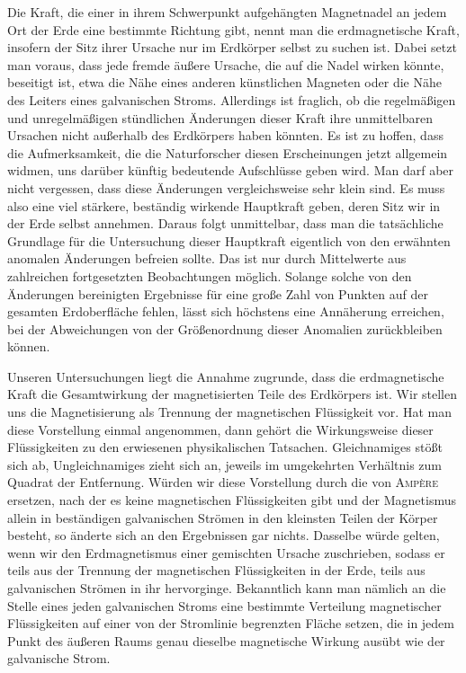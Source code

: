 Die Kraft, die einer in ihrem Schwerpunkt aufgehängten Magnetnadel an jedem Ort der Erde eine bestimmte Richtung gibt, nennt man die erdmagnetische Kraft, insofern der Sitz ihrer Ursache nur im Erdkörper selbst zu suchen ist. Dabei setzt man voraus, dass jede fremde äußere Ursache, die auf die Nadel wirken könnte, beseitigt ist, etwa die Nähe eines anderen künstlichen Magneten oder die Nähe des Leiters eines galvanischen Stroms. Allerdings ist fraglich, ob die regelmäßigen und unregelmäßigen stündlichen Änderungen dieser Kraft ihre unmittelbaren Ursachen nicht außerhalb des Erdkörpers haben könnten. Es ist zu hoffen, dass die Aufmerksamkeit, die die Naturforscher diesen Erscheinungen jetzt allgemein widmen, uns darüber künftig bedeutende Aufschlüsse geben wird. Man darf aber nicht vergessen, dass diese Änderungen vergleichsweise sehr klein sind. Es muss also eine viel stärkere, beständig wirkende Hauptkraft geben, deren Sitz wir in der Erde selbst annehmen. Daraus folgt unmittelbar, dass man die tatsächliche Grundlage für die Untersuchung dieser Hauptkraft eigentlich von den erwähnten anomalen Änderungen befreien sollte. Das ist nur durch Mittelwerte aus zahlreichen fortgesetzten Beobachtungen möglich. Solange solche von den Änderungen bereinigten Ergebnisse für eine große Zahl von Punkten auf der gesamten Erdoberfläche fehlen, lässt sich höchstens eine Annäherung erreichen, bei der Abweichungen von der Größenordnung dieser Anomalien zurückbleiben können.

Unseren Untersuchungen liegt die Annahme zugrunde, dass die erdmagnetische Kraft die Gesamtwirkung der magnetisierten Teile des Erdkörpers ist. Wir stellen uns die Magnetisierung als Trennung der magnetischen Flüssigkeit vor. Hat man diese Vorstellung einmal angenommen, dann gehört die Wirkungsweise dieser Flüssigkeiten zu den erwiesenen physikalischen Tatsachen. Gleichnamiges stößt sich ab, Ungleichnamiges zieht sich an, jeweils im umgekehrten Verhältnis zum Quadrat der Entfernung. Würden wir diese Vorstellung durch die von \textsc{Ampère} ersetzen, nach der es keine magnetischen Flüssigkeiten gibt und der Magnetismus allein in beständigen galvanischen Strömen in den kleinsten Teilen der Körper besteht, so änderte sich an den Ergebnissen gar nichts. Dasselbe würde gelten, wenn wir den Erdmagnetismus einer gemischten Ursache zuschrieben, sodass er teils aus der Trennung der magnetischen Flüssigkeiten in der Erde, teils aus galvanischen Strömen in ihr hervorginge. Bekanntlich kann man nämlich an die Stelle eines jeden galvanischen Stroms eine bestimmte Verteilung magnetischer Flüssigkeiten auf einer von der Stromlinie begrenzten Fläche setzen, die in jedem Punkt des äußeren Raums genau dieselbe magnetische Wirkung ausübt wie der galvanische Strom.

